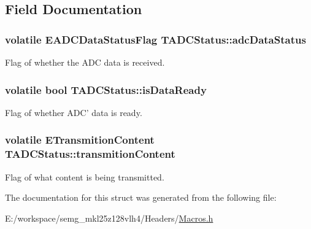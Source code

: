\subsection{Field Documentation}
\hypertarget{struct_t_a_d_c_status_a46b24bb1f6b819fdf3dd09cdbc30dda8}{
\subsubsection[{adc\-Data\-Status}]{\setlength{\rightskip}{0pt plus 5cm}volatile {\bf E\-A\-D\-C\-Data\-Status\-Flag} T\-A\-D\-C\-Status\-::adc\-Data\-Status}}\label{struct_t_a_d_c_status_a46b24bb1f6b819fdf3dd09cdbc30dda8}
Flag of whether the A\-D\-C data is received. \hypertarget{struct_t_a_d_c_status_a185baa2f9ddba5ae8664b9855a9fea20}{
\subsubsection[{is\-Data\-Ready}]{\setlength{\rightskip}{0pt plus 5cm}volatile bool T\-A\-D\-C\-Status\-::is\-Data\-Ready}}\label{struct_t_a_d_c_status_a185baa2f9ddba5ae8664b9855a9fea20}
Flag of whether A\-D\-C' data is ready. \hypertarget{struct_t_a_d_c_status_a8105600ceed44c216de66a84ef690219}{
\subsubsection[{transmition\-Content}]{\setlength{\rightskip}{0pt plus 5cm}volatile {\bf E\-Transmition\-Content} T\-A\-D\-C\-Status\-::transmition\-Content}}\label{struct_t_a_d_c_status_a8105600ceed44c216de66a84ef690219}
Flag of what content is being transmitted. 

The documentation for this struct was generated from the following file\-:\begin{DoxyCompactItemize}
\item 
E\-:/workspace/semg\-\_\-mkl25z128vlh4/\-Headers/\hyperlink{_macros_8h}{Macros.\-h}\end{DoxyCompactItemize}
